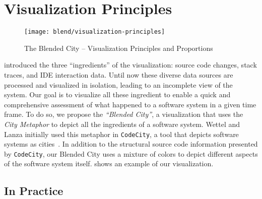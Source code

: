 \section{Visualization Principles}\label{sec:blend-visualization}

\begin{figure*}[ht]
\centering
\texttt{[image: blend/visualization-principles]}
\caption{The Blended City -- Visualization Principles and Proportions}
\label{fig:visualization-principles}
\end{figure*}

 introduced the three ``ingredients'' of the visualization: source code changes, stack traces, and IDE interaction data.
Until now these diverse data sources are processed and visualized in isolation, leading to an incomplete view of the system.
Our goal is to visualize all these ingredient to enable a quick and comprehensive assessment of what happened to a software system in a given time frame.
To do so, we propose the \emph{``Blended City''}, a visualization that uses the \emph{City Metaphor} to depict all the ingredients of a software system.
Wettel and Lanza initially used this metaphor in \texttt{CodeCity}, a tool that depicts software systems as cities~\cite{Wett2007}.
In addition to the structural source code information presented by \texttt{CodeCity}, our Blended City uses a mixture of colors to depict different aspects of the software system itself.
 shows an example of our visualization.

\subsection{In Practice}

